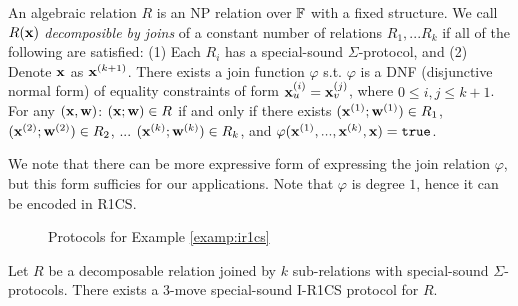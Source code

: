 \begin{definition} An algebraic relation $R$ is an NP relation
over $\mathbb{F}$ with a fixed structure.
We call $R({{\mathbf {x}}})$ {\em decomposible by joins} of a constant number of
relations $R_1, ... R_k$ if all of the following
are satisfied:
(1) Each $R_i$ has a special-sound
$\Sigma$-protocol, and
(2) Denote ${{\mathbf {x}}}$ as ${{\mathbf {x}}}^{(k+1)}$.
There exists a join function $\varphi$ s.t.
$\varphi$ is a DNF (disjunctive normal form) of 
equality constraints of form ${{\mathbf {x}}}^{(i)}_u = {{\mathbf {x}}}^{(j)}_v$,
where $0\leq i,j \leq k+1$.
For any $({{\mathbf {x}}}, {{\mathbf {w}}})$:
$({{\mathbf {x}}}; {{\mathbf {w}}}) \in R$ if and only if
there exists 
$({{\mathbf {x}}}^{(1)}; {{\mathbf {w}}}^{(1)}) \in R_1$,
$({{\mathbf {x}}}^{(2)}; {{\mathbf {w}}}^{(2)}) \in R_2$,
...
$({{\mathbf {x}}}^{(k)}; {{\mathbf {w}}}^{(k)}) \in R_k$, 
and $\varphi({{\mathbf {x}}}^{(1)}, ..., {{\mathbf {x}}}^{(k)},{{\mathbf {x}}}) = \texttt{true}$.
\end{definition}

We note that there can be more expressive form of expressing the
join relation $\varphi$, but this form sufficies for our applications.
Note that $\varphi$ is degree $1$, hence it can be encoded in R1CS.

\begin{figure}
\resizebox{0.90\textwidth}{!}{
	
}
\caption{Protocols for Example \ref{examp:ir1cs}}
\label{fig:2shots}
\end{figure}

\begin{lemma}\label{lemma:ir1cs}
Let $R$ be a decomposable relation joined by
$k$ sub-relations with special-sound $\Sigma$-protocols.
There exists a $3$-move
special-sound I-R1CS protocol for $R$. 
\end{lemma}

